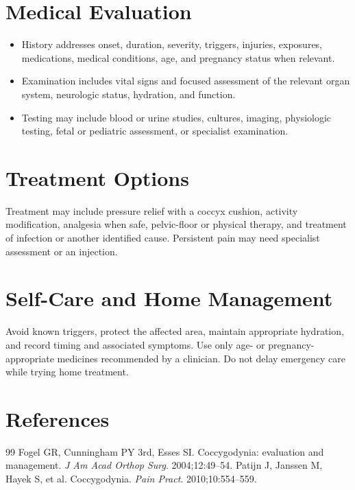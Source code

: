 \section*{Medical Evaluation}
\begin{itemize}
  \item History addresses onset, duration, severity, triggers, injuries, exposures, medications, medical conditions, age, and pregnancy status when relevant.
  \item Examination includes vital signs and focused assessment of the relevant organ system, neurologic status, hydration, and function.
  \item Testing may include blood or urine studies, cultures, imaging, physiologic testing, fetal or pediatric assessment, or specialist examination.
\end{itemize}

\section*{Treatment Options}
Treatment may include pressure relief with a coccyx cushion, activity modification, analgesia when safe, pelvic-floor or physical therapy, and treatment of infection or another identified cause. Persistent pain may need specialist assessment or an injection.

\section*{Self-Care and Home Management}
Avoid known triggers, protect the affected area, maintain appropriate hydration, and record timing and associated symptoms. Use only age- or pregnancy-appropriate medicines recommended by a clinician. Do not delay emergency care while trying home treatment.

\section*{References}
\begin{thebibliography}{99}
 Fogel GR, Cunningham PY 3rd, Esses SI. Coccygodynia: evaluation and management. \textit{J Am Acad Orthop Surg}. 2004;12:49--54.
 Patijn J, Janssen M, Hayek S, et al. Coccygodynia. \textit{Pain Pract}. 2010;10:554--559.
\end{thebibliography}
